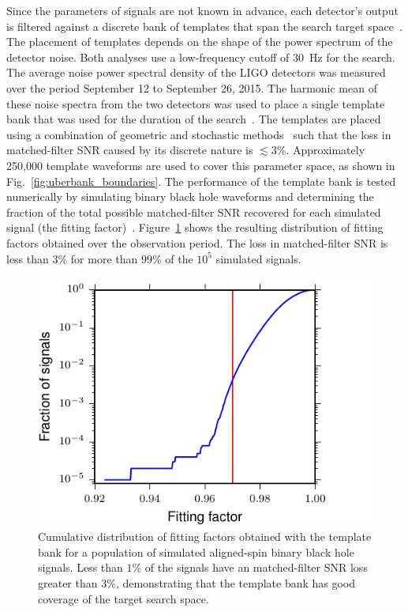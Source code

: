 Since the parameters of signals are not known in advance, each detector's
output is filtered against a discrete bank of templates that span the search
target
space~\cite{Sathyaprakash:1991mt,Owen:1995tm,Owen:1998dk,Babak:2006ty,Cokelaer:2007kx}.
The placement of templates depends on the shape of the power spectrum of the
detector noise. Both analyses use a low-frequency cutoff of $30$~Hz for the search. 
The average noise power spectral density of the LIGO detectors
was measured over the period September 12 to September 26, 2015. The harmonic
mean of these noise spectra from the two detectors was used to place a single
template bank that was used for the duration of the
search~\cite{Keppel:2013uma,Usman:2015kfa}. The templates are placed using a combination of
geometric and stochastic
methods~\cite{Harry:2009ea,Brown:2012qf,Privitera:2013xza,Capano:2016uif}
such that the loss in matched-filter SNR caused by its discrete nature is
$\lesssim 3$\%.  Approximately 250,000 template waveforms are used to cover
this parameter space, as shown in Fig.~\ref{fig:uberbank_boundaries}.  The
performance of the template bank is tested numerically by simulating binary
black hole waveforms and determining the fraction of the total possible
matched-filter SNR recovered for each simulated signal (the fitting
factor)~\cite{Apostolatos:1996rf}.  Figure~\ref{fig:uberbank_effectualness}
shows the resulting distribution of fitting factors obtained over the
observation period. The loss in matched-filter SNR is less than $3\%$ for more
than $99$\% of the $10^5$ simulated signals.
\begin{figure}[t]
\includegraphics[width=\columnwidth]{figs/chapter2/uberbank_effectualness.pdf} 
\caption{\label{fig:uberbank_effectualness}
Cumulative distribution of fitting factors obtained with the template bank for
a  population of simulated aligned-spin binary black hole signals.  Less than $1\%$ of the
signals have an matched-filter SNR loss greater than $3\%$, demonstrating that the
template bank has good coverage of the target search space.}
\end{figure}


